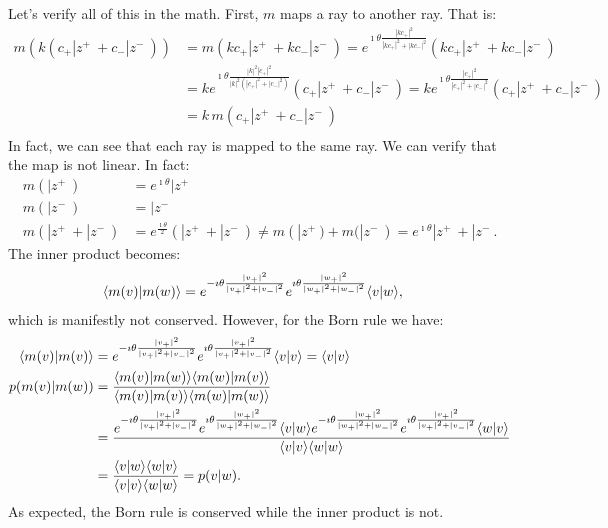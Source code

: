 Let's verify all of this in the math. First, $m$ maps a ray to another ray. That is:
\begin{equation}
	\begin{aligned}
		m(k(c_{+} | z^+ \> + c_{-} | z^- \>)) &= m(kc_{+} | z^+ \> + k c_{-} | z^- \>) = e^{\imath \theta \frac{|kc_{+}|^2}{|kc_{+}|^2+|kc_{-}|^2}} ( k c_{+} | z^+ \> + k c_{-}  | z^- \>) \\
		&= k e^{\imath \theta \frac{|k|^2|c_{+}|^2}{|k|^2(|c_{+}|^2+|c_{-}|^2)}} ( c_{+} | z^+ \> + c_{-}  | z^- \>) = k e^{\imath \theta \frac{|c_{+}|^2}{|c_{+}|^2+|c_{-}|^2}} \left( c_{+} | z^+ \> + c_{-}  | z^- \> \right) \\
		&= k \, m(c_{+} | z^+ \> + c_{-} | z^- \>) \\
	\end{aligned}
\end{equation}
In fact, we can see that each ray is mapped to the same ray. We can verify that the map is not linear. In fact:
\begin{equation}
	\begin{aligned}
		m(|z^+\>) &= e^{\imath \theta} |z^+\> \\
		m(|z^-\>) &= | z^- \>\\
		m(|z^+\> + |z^-\>) &= e^{\frac{\imath \theta}{2}}( |z^+\> +  | z^- \>) \neq m(|z^+\>) + m(|z^-\>) = e^{\imath \theta} |z^+\> + | z^- \>.
	\end{aligned}
\end{equation}
The inner product becomes:
\begin{equation}
	\begin{aligned}
		\langle m(v) | m(w) \rangle &= e^{-\imath \theta \frac{|v_{+}|^2}{|v_{+}|^2+|v_{-}|^2}} e^{\imath \theta \frac{|w_{+}|^2}{|w_{+}|^2+|w_{-}|^2}} \langle v | w \rangle,
	\end{aligned}
\end{equation}
which is manifestly not conserved. However, for the Born rule we have:
\begin{equation}
	\begin{aligned}
		\langle m(v) | m(v) \rangle &= e^{-\imath \theta \frac{|v_{+}|^2}{|v_{+}|^2+|v_{-}|^2}} e^{\imath \theta \frac{|v_{+}|^2}{|v_{+}|^2+|v_{-}|^2}} \langle v | v \rangle = \langle v | v \rangle \\
		p(m(v)|m(w)) &= \frac{\langle m(v) | m(w) \rangle\langle m(w) | m(v) \rangle}{\langle m(v) | m(v) \rangle\langle m(w) | m(w) \rangle} \\
		&= \frac{e^{-\imath \theta \frac{|v_{+}|^2}{|v_{+}|^2+|v_{-}|^2}} e^{\imath \theta \frac{|w_{+}|^2}{|w_{+}|^2+|w_{-}|^2}} \langle v | w \rangle e^{-\imath \theta \frac{|w_{+}|^2}{|w_{+}|^2+|w_{-}|^2}}e^{\imath \theta \frac{|v_{+}|^2}{|v_{+}|^2+|v_{-}|^2}}  \langle w | v \rangle}{\langle v | v \rangle\langle w | w \rangle} \\
		&= \frac{\langle v | w \rangle\langle w | v \rangle}{\langle v | v \rangle\langle w | w \rangle} = p(v|w).
	\end{aligned}
\end{equation}
As expected, the Born rule is conserved while the inner product is not.

